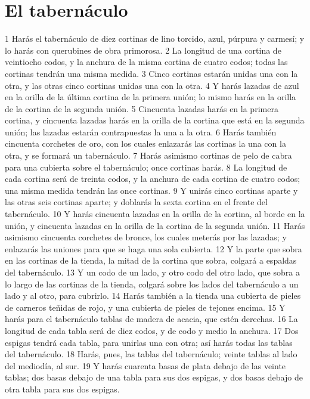 \section*{El tabernáculo}

1 Harás el tabernáculo de diez cortinas de lino torcido, azul, púrpura y carmesí; y lo harás con querubines de obra primorosa.
2 La longitud de una cortina de veintiocho codos,  y la anchura de la misma cortina de cuatro codos; todas las cortinas tendrán una misma medida.
3 Cinco cortinas estarán unidas una con la otra, y las otras cinco cortinas unidas una con la otra.
4 Y harás lazadas de azul en la orilla de la última cortina de la primera unión; lo mismo harás en la orilla de la cortina de la segunda unión.
5 Cincuenta lazadas harás en la primera cortina, y cincuenta lazadas harás en la orilla de la cortina que está en la segunda unión; las lazadas estarán contrapuestas la una a la otra.
6 Harás también cincuenta corchetes de oro, con los cuales enlazarás las cortinas la una con la otra, y se formará un tabernáculo.
7 Harás asimismo cortinas de pelo de cabra para una cubierta sobre el tabernáculo; once cortinas harás.
8 La longitud de cada cortina será de treinta codos,  y la anchura de cada cortina de cuatro codos; una misma medida tendrán las once cortinas.
9 Y unirás cinco cortinas aparte y las otras seis cortinas aparte; y doblarás la sexta cortina en el frente del tabernáculo.
10 Y harás cincuenta lazadas en la orilla de la cortina, al borde en la unión, y cincuenta lazadas en la orilla de la cortina de la segunda unión.
11 Harás asimismo cincuenta corchetes de bronce, los cuales meterás por las lazadas; y enlazarás las uniones para que se haga una sola cubierta.
12 Y la parte que sobra en las cortinas de la tienda, la mitad de la cortina que sobra, colgará a espaldas del tabernáculo.
13 Y un codo   de un lado, y otro codo del otro lado, que sobra a lo largo de las cortinas de la tienda, colgará sobre los lados del tabernáculo a un lado y al otro, para cubrirlo.
14 Harás también a la tienda una cubierta de pieles de carneros teñidas de rojo, y una cubierta de pieles de tejones encima.
15 Y harás para el tabernáculo tablas de madera de acacia, que estén derechas.
16 La longitud de cada tabla será de diez codos,  y de codo y medio la anchura.
17 Dos espigas tendrá cada tabla, para unirlas una con otra; así harás todas las tablas del tabernáculo.
18 Harás, pues, las tablas del tabernáculo; veinte tablas al lado del mediodía, al sur.
19 Y harás cuarenta basas de plata debajo de las veinte tablas; dos basas debajo de una tabla para sus dos espigas, y dos basas debajo de otra tabla para sus dos espigas.
